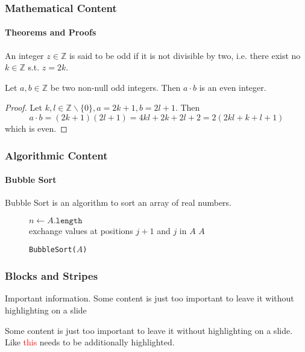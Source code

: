 	\begin{framefont}{\small}
	\begin{frame}
	    \frametitle{Mathematical Content}
	    \framesubtitle{Theorems and Proofs}
	    
	    \begin{definition}
	    An integer $z \in \mathbb{Z}$ is said to be odd if it is not divisible by two, i.e. there exist no $k \in \mathbb Z$ s.t. $z = 2k$.
	    \end{definition}
	    
	    \begin{theorem}
	    Let $a, b \in \mathbb Z$ be two non-null odd integers. Then $a \cdot b$ is an even integer.
	    \end{theorem}
	    
	    \begin{proof}
	    Let $k, l \in \mathbb{Z} \backslash \{0\}, a = 2k+1, b = 2l+1$. Then
	    $$
	    a \cdot b = (2k+1)(2l+1) = 4kl + 2k + 2l + 2 = 2(2kl + k + l + 1)
	    $$
	    which is even.
	    \end{proof}
	\end{frame}
	\end{framefont}
	
	\begin{frame}
	    \frametitle{Algorithmic Content}
	    \framesubtitle{Bubble Sort}
	    Bubble Sort is an algorithm to sort an array of real numbers.
	    \vspace{1em}
	    
	    \begin{figure}
    	    \centering
    	    \begin{algorithm}[H]
    	        \caption{\texttt{BubbleSort($A$)}}
        	    $n \leftarrow A.\texttt{length}$\\
        	    \For{$i=1$ to $n$}
        	    {
        	    \For{$j=0$ to $n-i$}
        	    {
        	    \If{$A[j+1] < A[j]$}
        	    {
        	    exchange values at positions $j+1$ and $j$ in $A$
        	    }
        	    }
        	    }
        	    \Return $A$
    	    \end{algorithm}
	    \end{figure}
	\end{frame}
	
	\begin{frame}
	    \frametitle{Blocks and Stripes}
	    
	    \begin{block}{Important information.}
	    Some content is just too important to leave it without highlighting on a slide
	    \end{block}
	    
	    \begin{stripe}
	    Some content is just too important to leave it without highlighting on a slide. Like \textcolor{red}{this} needs to be additionally highlighted.
	    \end{stripe}
	 \end{frame}
	 
